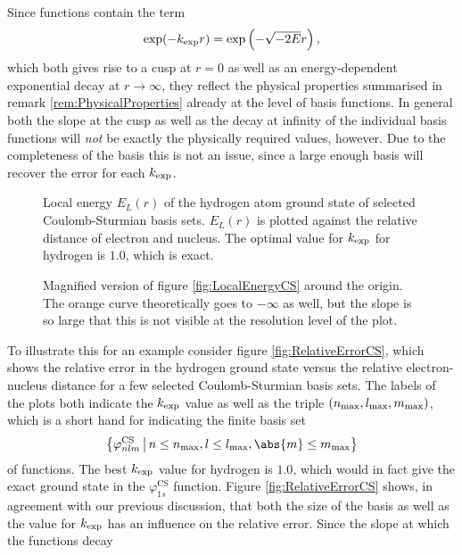 \noindent
Since \CS functions contain the term
\[ \exp(-k_\text{exp} r) = \exp\left( - \sqrt{-2E}r \right), \]
which both gives rise to a cusp at $r=0$ as well as
an energy-dependent exponential decay at $r\to\infty$,
they reflect the physical properties summarised in remark \vref{rem:PhysicalProperties}
already at the level of basis functions.
In general both the slope at the cusp as well as the decay at infinity
of the individual basis functions will \emph{not} be exactly the physically
required values, however.
Due to the completeness of the \CS basis
this is not an issue, since a large enough basis will recover the error
for each $k_\text{exp}$.%
%
\begin{figure}[p]
	\centering
	\caption[Local energy of the hydrogen ground state for {\CS} bases]{
		Local energy $E_L(r)$ of the hydrogen atom ground state
		of selected Coulomb-Sturmian basis sets.
		$E_L(r)$ is plotted against the relative distance
		of electron and nucleus.
		The optimal value for $k_\text{exp}$ for hydrogen is $1.0$,
		which is exact.
	}
	\label{fig:LocalEnergyCS}
\end{figure}
%
\begin{figure}[p]
	\centering
	\caption[Local energy of the hydrogen ground state for {\cGTO}s (magnified)]{
		Magnified version of figure \vref{fig:LocalEnergyCS}
		around the origin.
		The orange curve theoretically goes to $-\infty$ as well,
		but the slope is so large that this is not visible
		at the resolution level of the plot.
	}
	\label{fig:LocalEnergyCSZoom}
\end{figure}
%
To illustrate this for an example consider figure \vref{fig:RelativeErrorCS},
which shows the relative error in the hydrogen ground state
versus the relative electron-nucleus distance
for a few selected Coulomb-Sturmian basis sets.
The labels of the plots both indicate the $k_\text{exp}$ value as well as the
triple  $(n_\text{max}, l_\text{max}, m_\text{max})$, which is a short hand for indicating
the finite basis set
\[ \left\{ \varphi^\text{CS}_{nlm} \, \middle| \, n \leq \nmax, l \leq \lmax, \abs{m} \leq \mmax \right\} \]
of \CS functions.
The best $k_\text{exp}$ value for hydrogen is $1.0$,
which would in fact give the exact ground state in the $\varphi^\text{CS}_{1s}$ function.
Figure \vref{fig:RelativeErrorCS} shows, in agreement with our previous discussion,
that both the size of the basis as well as the value for $k_\text{exp}$ has an influence
on the relative error.
Since the slope at which the \CS functions decay
